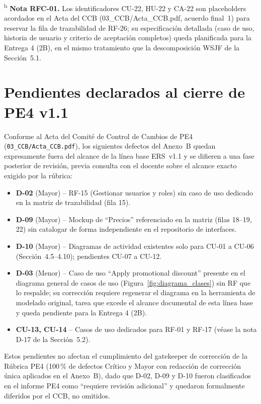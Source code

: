 \documentclass[11pt,a4paper]{article}
\begin{document}
\textsuperscript{b} \textbf{Nota RFC-01.} Los identificadores CU-22, HU-22 y CA-22 son placeholders acordados en el Acta del CCB (03\_CCB/Acta\_CCB.pdf, acuerdo final~1) para reservar la fila de trazabilidad de RF-26; su especificación detallada (caso de uso, historia de usuario y criterio de aceptación completos) queda planificada para la Entrega 4 (2B), en el mismo tratamiento que la descomposición WSJF de la Sección~5.1.
\normalsize

\section{Pendientes declarados al cierre de PE4 v1.1}
\label{sec:pendientes-v11}
Conforme al Acta del Comité de Control de Cambios de PE4 (\texttt{03\_CCB/Acta\_CCB.pdf}), los siguientes defectos del Anexo~B quedan expresamente fuera del alcance de la línea base ERS~v1.1 y se difieren a una fase posterior de revisión, previa consulta con el docente sobre el alcance exacto exigido por la rúbrica:

\begin{itemize}[nosep]
\item \textbf{D-02} (Mayor) -- RF-15 (Gestionar usuarios y roles) sin caso de uso dedicado en la matriz de trazabilidad (fila 15).
\item \textbf{D-09} (Mayor) -- Mockup de ``Precios'' referenciado en la matriz (filas 18--19, 22) sin catalogar de forma independiente en el repositorio de interfaces.
\item \textbf{D-10} (Mayor) -- Diagramas de actividad existentes solo para CU-01 a CU-06 (Sección~4.5--4.10); pendientes CU-07 a CU-12.
\item \textbf{D-03} (Menor) -- Caso de uso ``Apply promotional discount'' presente en el diagrama general de casos de uso (Figura~\ref{fig:diagrama_clases}) sin RF que lo respalde; su corrección requiere regenerar el diagrama en la herramienta de modelado original, tarea que excede el alcance documental de esta línea base y queda pendiente para la Entrega 4 (2B).
\item \textbf{CU-13, CU-14} -- Casos de uso dedicados para RF-01 y RF-17 (véase la nota D-17 de la Sección~5.2).
\end{itemize}

Estos pendientes no afectan el cumplimiento del gatekeeper de corrección de la Rúbrica PE4 (100\,\% de defectos Crítico y Mayor con redacción de corrección única aplicados en el Anexo~B), dado que D-02, D-09 y D-10 fueron clasificados en el informe PE4 como ``requiere revisión adicional'' y quedaron formalmente diferidos por el CCB, no omitidos.
\end{document}

